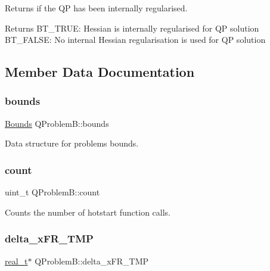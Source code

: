 Returns if the QP has been internally regularised. \begin{DoxyReturn}{Returns}
B\+T\+\_\+\+T\+R\+UE\+: Hessian is internally regularised for QP solution ~\newline
 B\+T\+\_\+\+F\+A\+L\+SE\+: No internal Hessian regularisation is used for QP solution 
\end{DoxyReturn}


\subsection{Member Data Documentation}
\mbox{\label{class_q_problem_b_af0822225676e7ca195a0724a8841c4d9}} 
\subsubsection{\texorpdfstring{bounds}{bounds}}
{\footnotesize\ttfamily \hyperlink{class_bounds}{Bounds} Q\+Problem\+B\+::bounds\hspace{0.3cm}{\ttfamily [protected]}}

Data structure for problem\textquotesingle{}s bounds. \mbox{\label{class_q_problem_b_a4d259bca2027133955de304eac49054b}} 
\subsubsection{\texorpdfstring{count}{count}}
{\footnotesize\ttfamily uint\+\_\+t Q\+Problem\+B\+::count\hspace{0.3cm}{\ttfamily [protected]}}

Counts the number of hotstart function calls. \mbox{\label{class_q_problem_b_a06e401f5f0d6f9a9ce2caa81dc5d85b6}} 
\subsubsection{\texorpdfstring{delta\+\_\+x\+F\+R\+\_\+\+T\+MP}{delta\_xFR\_TMP}}
{\footnotesize\ttfamily \hyperlink{qp_o_a_s_e_s__wrapper_8h_a0d00e2b3dfadee81331bbb39068570c4}{real\+\_\+t}$\ast$ Q\+Problem\+B\+::delta\+\_\+x\+F\+R\+\_\+\+T\+MP\hspace{0.3cm}{\ttfamily [protected]}}


